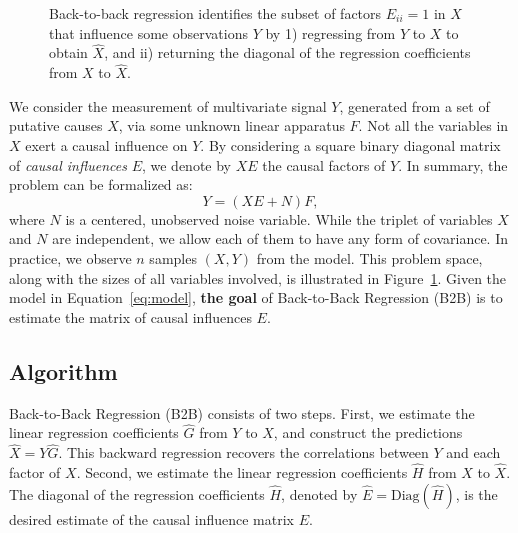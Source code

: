 \documentclass{article}
\begin{document}
\begin{figure}[t!]
    \caption{Back-to-back regression identifies the subset of factors $E_{ii} = 1$ in $X$ that influence some observations $Y$ by 1) regressing from $Y$ to $X$ to obtain $\hat{X}$, and ii) returning the diagonal of the regression coefficients from $X$ to $\hat{X}$.}
    \label{fig:b2b}
\end{figure}

We consider the measurement of multivariate signal $Y$, generated from a set of putative causes $X$, via some unknown linear apparatus $F$.
%
Not all the variables in $X$ exert a causal influence on $Y$.
%
By considering a square binary diagonal matrix of \emph{causal influences} $E$, we denote by $XE$ the causal factors of $Y$.
%
In summary, the problem can be formalized as:
%
\begin{equation}
    Y = (XE + N)F,\label{eq:model}
\end{equation}
%
where $N$ is a centered, unobserved noise variable.
%
While the triplet of variables $X$ and $N$ are independent, we allow each of them to have any form of covariance.
%
In practice, we observe $n$ samples $(X, Y)$ from the model.
%
This problem space, along with the sizes of all variables involved, is illustrated in Figure~\ref{fig:b2b}.
%
Given the model in Equation~\eqref{eq:model}, \textbf{the goal} of Back-to-Back Regression (B2B) is to estimate the matrix of causal influences $E$.

\subsection{Algorithm}


Back-to-Back Regression (B2B) consists of two steps.
%
First, we estimate the linear regression coefficients $\hat G$ from $Y$ to $X$, and construct the predictions $\hat X = Y \hat G$.
%
This backward regression recovers the correlations between $Y$ and each factor of $X$.
%
Second, we estimate the linear regression coefficients $\hat H$ from $X$ to $\hat X$.
%
The diagonal of the regression coefficients $\hat H$, denoted by $\hat{E} = \text{Diag}(\hat{H})$, is the desired estimate of the causal influence matrix $E$.
\end{document}
